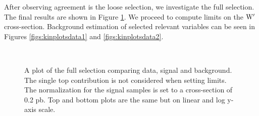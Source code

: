 After observing agreement is the loose selection, we investigate the full selection.  The final results are shown in Figure \ref{figs:MtbvsBkg1}.  We proceed to compute 
limits on the $\mathrm{W}^\prime$ cross-section.  Background estimation of selected relevant variables can be seen in 
Figures \ref{figs:kinplotsdata1} and \ref{figs:kinplotsdata2}.

\begin{figure}[htcb]
\begin{center}
\\
\caption{
A plot of the full selection comparing data, signal and background.  
The single top contribution is not considered when setting limits.  
The normalization for the signal samples is set to a cross-section of 0.2 pb.  Top and bottom plots are the same but on linear and log y-axis scale.}
\label{figs:MtbvsBkg1}
\end{center}
\end{figure}

